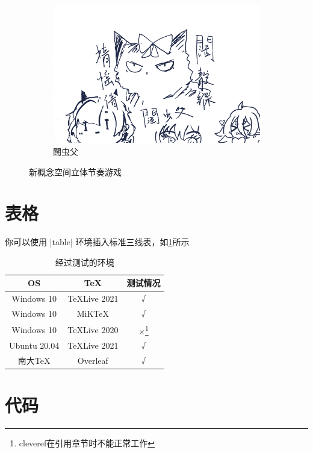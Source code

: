 \begin{figure}[htbp]
    \begin{subfigure}{.32\textwidth}
        \centering
        \includegraphics[width=\textwidth]{test.png}
        \caption{闊虫父}
    \end{subfigure}
    \caption{新概念空间立体节奏游戏}
\end{figure}
    
\section{表格}

你可以使用 |table| 环境插入标准三线表，如\cref{tab:testtab}所示

\begin{table}[htbp]
    \centering
    \caption{经过测试的环境}
    \label{tab:testtab}
    \begin{tabular}{ccc}
        \toprule
        OS & TeX & 测试情况 \\
        \midrule
        Windows 10 & TeXLive 2021 & √ \\
        Windows 10 & MiKTeX & √ \\
        Windows 10 & TeXLive 2020 & ×\footnote{cleveref在引用章节时不能正常工作}  \\
        Ubuntu 20.04 & TeXLive 2021 & √ \\
        南大TeX & Overleaf & √ \\
        \bottomrule
    \end{tabular}
\end{table}

\section{代码}

